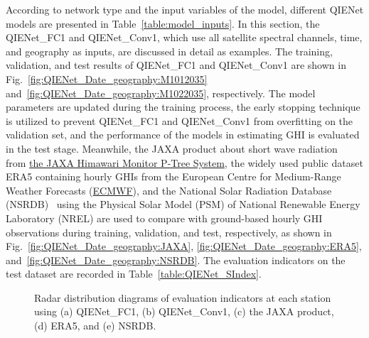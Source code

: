 \documentclass[review]{elsarticle}
\begin{document}
According to network type and the input variables of the model, different QIENet models are presented in Table~\ref{table:model_inputs}.
In this section, the QIENet\_FC1 and QIENet\_Conv1, which use all satellite spectral channels, time, and geography as inputs, are discussed in detail as examples.
The training, validation, and test results of QIENet\_FC1 and QIENet\_Conv1 are shown in Fig.~\ref{fig:QIENet_Date_geography:M1012035} and~\ref{fig:QIENet_Date_geography:M1022035}, respectively.
The model parameters are updated during the training process,
the early stopping technique is utilized to prevent QIENet\_FC1 and QIENet\_Conv1 from overfitting on the validation set, and the performance of the models in estimating GHI is evaluated in the test stage.
Meanwhile, the JAXA product about short wave radiation~\citep{Damiani2018, Takenaka2011} from \href{https://www.eorc.jaxa.jp/ptree/index.html}{the JAXA Himawari Monitor P-Tree System}, the widely used public dataset ERA5 containing hourly GHIs from the European Centre for Medium-Range Weather Forecasts (\href{https://cds.climate.copernicus.eu}{ECMWF}), and the National Solar Radiation Database (NSRDB)~\citep{SENGUPTA201851} using the Physical Solar Model (PSM) of National Renewable Energy Laboratory (NREL) are used to compare with ground-based hourly GHI observations during training, validation, and test, respectively, as shown in Fig.~\ref{fig:QIENet_Date_geography:JAXA}, \ref{fig:QIENet_Date_geography:ERA5}, and~\ref{fig:QIENet_Date_geography:NSRDB}.
The evaluation indicators on the test dataset are recorded in Table~\ref{table:QIENet_SIndex}.

\begin{figure}[!htbp]
    \centering
    \caption{Radar distribution diagrams of evaluation indicators at each station using (a) QIENet\_FC1, (b) QIENet\_Conv1, (c) the JAXA product, (d) ERA5, and (e) NSRDB.}
    \label{fig:index_GHI_station}
\end{figure}
\end{document}

